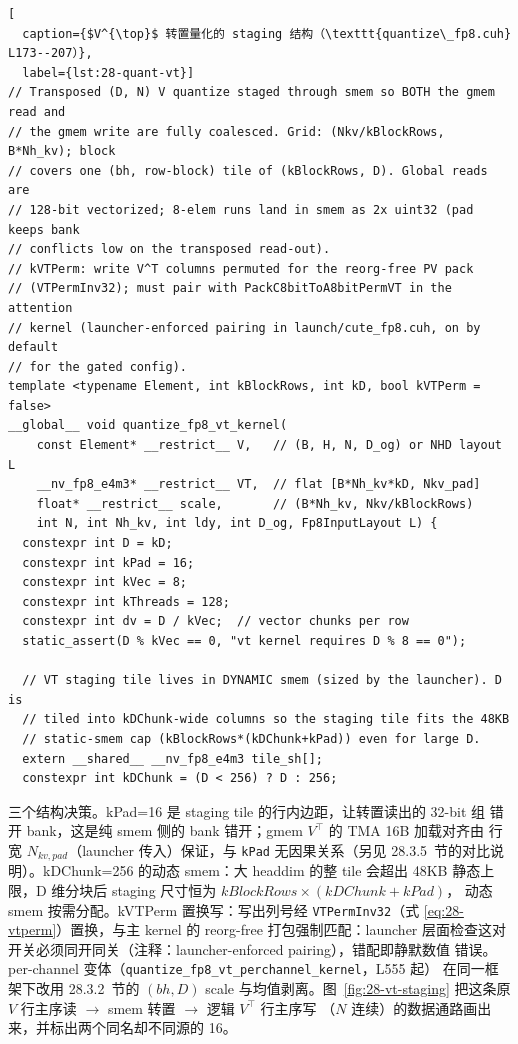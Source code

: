 \begin{lstlisting}[
  caption={$V^{\top}$ 转置量化的 staging 结构（\texttt{quantize\_fp8.cuh} L173--207）},
  label={lst:28-quant-vt}]
// Transposed (D, N) V quantize staged through smem so BOTH the gmem read and
// the gmem write are fully coalesced. Grid: (Nkv/kBlockRows, B*Nh_kv); block
// covers one (bh, row-block) tile of (kBlockRows, D). Global reads are
// 128-bit vectorized; 8-elem runs land in smem as 2x uint32 (pad keeps bank
// conflicts low on the transposed read-out).
// kVTPerm: write V^T columns permuted for the reorg-free PV pack
// (VTPermInv32); must pair with PackC8bitToA8bitPermVT in the attention
// kernel (launcher-enforced pairing in launch/cute_fp8.cuh, on by default
// for the gated config).
template <typename Element, int kBlockRows, int kD, bool kVTPerm = false>
__global__ void quantize_fp8_vt_kernel(
    const Element* __restrict__ V,   // (B, H, N, D_og) or NHD layout L
    __nv_fp8_e4m3* __restrict__ VT,  // flat [B*Nh_kv*kD, Nkv_pad]
    float* __restrict__ scale,       // (B*Nh_kv, Nkv/kBlockRows)
    int N, int Nh_kv, int ldy, int D_og, Fp8InputLayout L) {
  constexpr int D = kD;
  constexpr int kPad = 16;
  constexpr int kVec = 8;
  constexpr int kThreads = 128;
  constexpr int dv = D / kVec;  // vector chunks per row
  static_assert(D % kVec == 0, "vt kernel requires D % 8 == 0");

  // VT staging tile lives in DYNAMIC smem (sized by the launcher). D is
  // tiled into kDChunk-wide columns so the staging tile fits the 48KB
  // static-smem cap (kBlockRows*(kDChunk+kPad)) even for large D.
  extern __shared__ __nv_fp8_e4m3 tile_sh[];
  constexpr int kDChunk = (D < 256) ? D : 256;
\end{lstlisting}

三个结构决策。kPad=16 是 staging tile 的行内边距，让转置读出的 32-bit 组
错开 bank，这是纯 smem 侧的 bank 错开；gmem $V^{\top}$ 的 TMA 16B 加载对齐由
行宽 $N_{kv,pad}$（launcher 传入）保证，与 \texttt{kPad} 无因果关系（另见
28.3.5~节的对比说明）。kDChunk=256 的动态 smem：大 headdim 的整 tile 会超出
48KB 静态上限，D 维分块后 staging 尺寸恒为 $kBlockRows\times(kDChunk+kPad)$，
动态 smem 按需分配。kVTPerm 置换写：写出列号经 \texttt{VTPermInv32}（式
\ref{eq:28-vtperm}）置换，与主 kernel 的 reorg-free 打包强制匹配：launcher
层面检查这对开关必须同开同关（注释：launcher-enforced pairing），错配即静默数值
错误。per-channel 变体（\texttt{quantize\_fp8\_vt\_perchannel\_kernel}，L555 起）
在同一框架下改用 28.3.2~节的 $(bh, D)$ scale 与均值剥离。图~\ref{fig:28-vt-staging}
把这条原 $V$ 行主序读 $\to$ smem 转置 $\to$ 逻辑 $V^{\top}$ 行主序写
（$N$ 连续）的数据通路画出来，并标出两个同名却不同源的 16。


